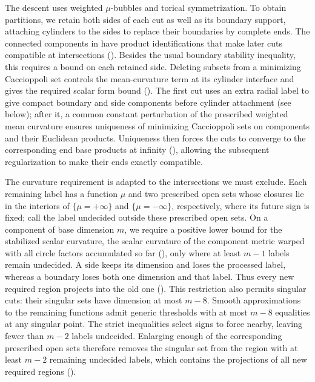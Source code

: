 The descent uses weighted \(\mu\)-bubbles and torical symmetrization.
To obtain partitions, we retain both sides of each cut as well as its
boundary support, attaching cylinders to the sides to replace their boundaries by complete ends.
The connected components in  have product identifications that make later cuts
compatible at intersections (). Besides the usual
boundary stability inequality, this requires a bound on each retained
side. Deleting subsets from a minimizing Caccioppoli set controls the
mean-curvature term at its cylinder interface and gives the required scalar
form bound (). The first cut
uses an extra radial label to give compact boundary and side components
before cylinder attachment (see below); after it, a common constant perturbation of the prescribed weighted mean curvature
ensures uniqueness of minimizing Caccioppoli sets on components and their
Euclidean products. Uniqueness then forces the cuts to converge to
the corresponding end base products at infinity
(), allowing the
subsequent regularization to make their ends exactly compatible.

The curvature requirement is adapted to the intersections we must
exclude. Each remaining label has a function \(\mu\) and two prescribed
open sets whose closures lie in the interiors of \(\{\mu=+\infty\}\)
and \(\{\mu=-\infty\}\), respectively, where its future sign is fixed;
call the label undecided outside these prescribed open sets.
On a component of base dimension \(m\), we require a positive lower bound
for the stabilized scalar curvature, the scalar curvature of the component
metric warped with all circle factors accumulated so far
(), only where at least \(m-1\) labels remain
undecided.
A side keeps its dimension and loses the processed label, whereas
a boundary loses both one dimension and that label. Thus every new
required region projects into the old one
(). This restriction also permits
singular cuts: their singular sets have dimension at most \(m-8\).
Smooth approximations to the remaining functions admit generic
thresholds with at most \(m-8\) equalities at any singular point.
The strict inequalities select signs to force nearby, leaving fewer
than \(m-2\) labels undecided. Enlarging enough of the corresponding
prescribed open sets therefore removes the singular set from the region with at least
\(m-2\) remaining undecided labels, which contains the projections of
all new required regions
().

